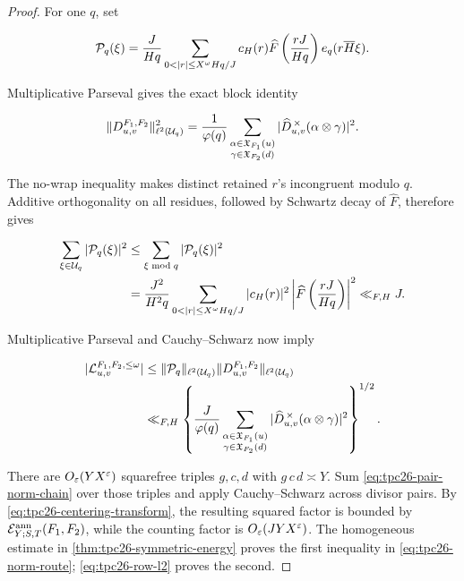 \begin{proof}
For one \(q\), set

\[
 \cP_q(\xi)=\frac{J}{Hq}
 \sum_{0<|r|\le X^\omega Hq/J}
 c_H(r)\widehat F\left(\frac{rJ}{Hq}\right)
 e_q(r\overline H\xi).
\]

Multiplicative Parseval gives the exact block identity

\begin{equation}
 \|D_{u,v}^{F_1,F_2}\|_{\ell^2(\mathcal U_q)}^2
 =\frac1{\varphi(q)}
 \sum_{\substack{\alpha\in\mathfrak X_{F_1}(u)\\
                  \gamma\in\mathfrak X_{F_2}(d)}}
 |\widehat D_{u,v}^{\,\times}(\alpha\otimes\gamma)|^2.
 \label{eq:tpc26-pair-block-Parseval}
\end{equation}

The no-wrap inequality makes distinct retained \(r\)'s incongruent
modulo \(q\).  Additive orthogonality on all residues, followed by
Schwartz decay of \(\widehat F\), therefore gives

\begin{align}
 \sum_{\xi\in\cU_q}|\cP_q(\xi)|^2
 &\le \sum_{\xi\bmod q}|\cP_q(\xi)|^2
 \notag\\
 &=\frac{J^2}{H^2q}
 \sum_{0<|r|\le X^\omega Hq/J}
 |c_H(r)|^2
 \left|\widehat F\left(\frac{rJ}{Hq}\right)\right|^2
 \ll_{F,H}J.
 \label{eq:tpc26-Pq-l2}
\end{align}

Multiplicative Parseval and Cauchy--Schwarz now imply

\begin{align}
 |\mathcal L_{u,v}^{F_1,F_2,\le\omega}|
 &\le \|\mathcal P_q\|_{\ell^2(\mathcal U_q)}
       \|D_{u,v}^{F_1,F_2}\|_{\ell^2(\mathcal U_q)}
 \notag\\
 &\ll_{F,H}
 \left\{\frac{J}{\varphi(q)}
 \sum_{\substack{\alpha\in\mathfrak X_{F_1}(u)\\
                   \gamma\in\mathfrak X_{F_2}(d)}}
 |\widehat D_{u,v}^{\,\times}(\alpha\otimes\gamma)|^2
 \right\}^{1/2}.
 \label{eq:tpc26-pair-norm-chain}
\end{align}

There are \(O_\varepsilon(YX^\varepsilon)\) squarefree triples
\(g,c,d\) with \(g\,c\,d\asymp Y\).  Sum
\eqref{eq:tpc26-pair-norm-chain} over those triples and apply
Cauchy--Schwarz across divisor pairs.  By
\eqref{eq:tpc26-centering-transform}, the resulting squared factor is
bounded by \(\mathcal E^{\rm ann}_{Y;S,T}(F_1,F_2)\), while the counting
factor is \(O_\varepsilon(JYX^\varepsilon)\).  The homogeneous estimate in
\cref{thm:tpc26-symmetric-energy} proves the first inequality in
\eqref{eq:tpc26-norm-route}; \eqref{eq:tpc26-row-l2} proves the second.
\end{proof}

